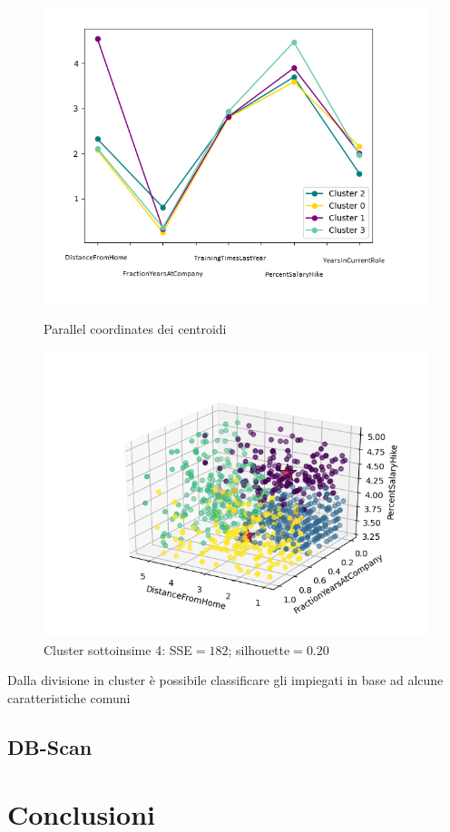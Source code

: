 \documentclass[english]{article}
\begin{document}
\begin{figure}[H]
\begin{minipage}[b]{0.47\textwidth}
\centering
\includegraphics[width=\textwidth]{parr cor frac6.png}
\caption{Parallel coordinates dei centroidi}
\label{etichetta1}
\end{minipage}
\hfill
\begin{minipage}[b]{0.55\textwidth}
\includegraphics[scale=0.6]{FractionYear_Distance_Percent_CENTROIDI6.png}
\caption{Cluster sottoinsime 4: SSE$=182$; silhouette$=0.20$}
\label{etichetta2}
\end{minipage}
\end{figure}

Dalla divisione in cluster è possibile classificare gli impiegati in base ad alcune caratteristiche comuni

\subsection{DB-Scan}

\section{Conclusioni}
\end{document}
